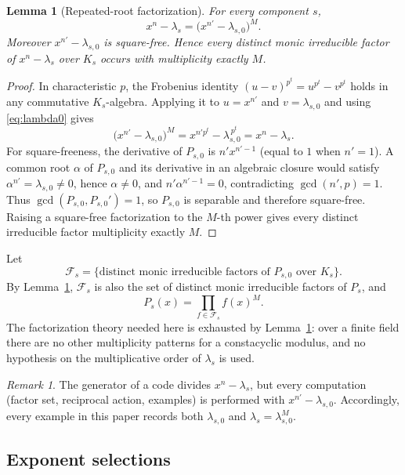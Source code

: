 \documentclass[11pt,a4paper]{article}
\newcommand{\Fs}{\mathcal F_s}
\numberwithin{equation}{section}
\theoremstyle{plain}
\newtheorem{lemma}[theorem]{Lemma}
\theoremstyle{definition}
\theoremstyle{remark}
\newtheorem{remark}[theorem]{Remark}
\begin{document}
\begin{lemma}[Repeated-root factorization]\label{lem:factorisation}
For every component $s$,
\begin{equation}\label{eq:factorisation}
x^n-\lambda_s=\bigl(x^{n'}-\lambda_{s,0}\bigr)^M .
\end{equation}
Moreover $x^{n'}-\lambda_{s,0}$ is square-free.  Hence every distinct monic
irreducible factor of $x^n-\lambda_s$ over $K_s$ occurs with multiplicity
exactly $M$.
\end{lemma}

\begin{proof}
In characteristic $p$, the Frobenius identity
$(u-v)^{p^t}=u^{p^t}-v^{p^t}$ holds in any commutative $K_s$-algebra.  Applying
it to $u=x^{n'}$ and $v=\lambda_{s,0}$ and using \eqref{eq:lambda0} gives
\[
\bigl(x^{n'}-\lambda_{s,0}\bigr)^M
   =x^{n'p^t}-\lambda_{s,0}^{\,p^t}=x^n-\lambda_s .
\]
For square-freeness, the derivative of $P_{s,0}$ is $n'x^{n'-1}$ (equal to $1$
when $n'=1$).  A common root $\alpha$ of $P_{s,0}$ and its derivative in an
algebraic closure would satisfy $\alpha^{n'}=\lambda_{s,0}\neq0$, hence
$\alpha\neq0$, and $n'\alpha^{n'-1}=0$, contradicting $\gcd(n',p)=1$.
Thus $\gcd(P_{s,0},P_{s,0}')=1$, so $P_{s,0}$ is separable and therefore
square-free.  Raising a square-free factorization to the $M$-th power gives
every distinct irreducible factor multiplicity exactly $M$.
\end{proof}

Let
\[
\Fs=\{\text{distinct monic irreducible factors of }P_{s,0}\text{ over }K_s\}.
\]
By Lemma~\ref{lem:factorisation}, $\Fs$ is also the set of distinct monic
irreducible factors of $P_s$, and
\[
P_s(x)=\prod_{f\in\Fs}f(x)^M .
\]
The factorization theory needed here is exhausted by
Lemma~\ref{lem:factorisation}: over a finite field there are no other
multiplicity patterns for a constacyclic modulus, and no hypothesis on the
multiplicative order of $\lambda_s$ is used.

\begin{remark}\label{rem:lambda0}
The generator of a code divides $x^n-\lambda_s$, but every computation (factor
set, reciprocal action, examples) is performed with $x^{n'}-\lambda_{s,0}$.
Accordingly, every example in this paper records both $\lambda_{s,0}$ and
$\lambda_s=\lambda_{s,0}^M$.
\end{remark}

\subsection{Exponent selections}\label{sec:selections}
\end{document}
